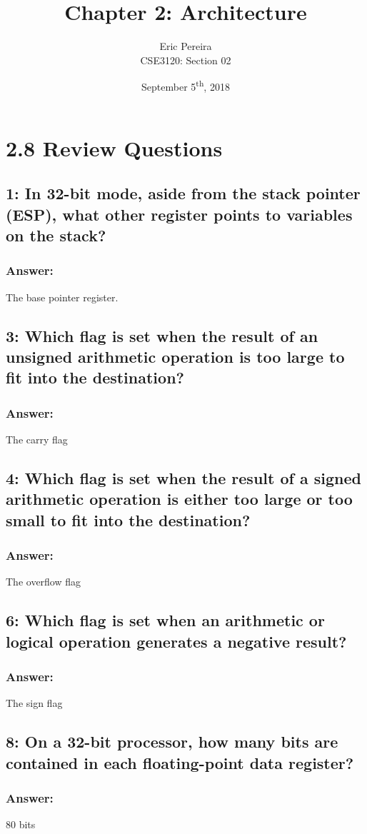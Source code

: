 \documentclass[12pt]{article}
\begin{document}
\author{Eric Pereira\\
	CSE3120: Section 02}
\date{September 5\textsuperscript{th}, 2018}
\title{Chapter 2: Architecture}
\maketitle

\section*{2.8 Review Questions}

\subsection*{1: In 32-bit mode, aside from the stack pointer (ESP), what other register points to variables on the stack?}
\subsubsection*{Answer:}
The base pointer register. 
\subsection*{3: Which flag is set when the result of an unsigned arithmetic operation is too large to fit into the destination?}
\subsubsection*{Answer:}
The carry flag
\subsection*{4: Which flag is set when the result of a signed arithmetic operation is either too large or too small to fit into the destination?}
\subsubsection*{Answer:}
The overflow flag
\subsection*{6: Which flag is set when an arithmetic or logical operation generates a negative result?}
\subsubsection*{Answer:}
The sign flag
\subsection*{8: On a 32-bit processor, how many bits are contained in each floating-point data register?}
\subsubsection*{Answer:}
80 bits
\end{document}
